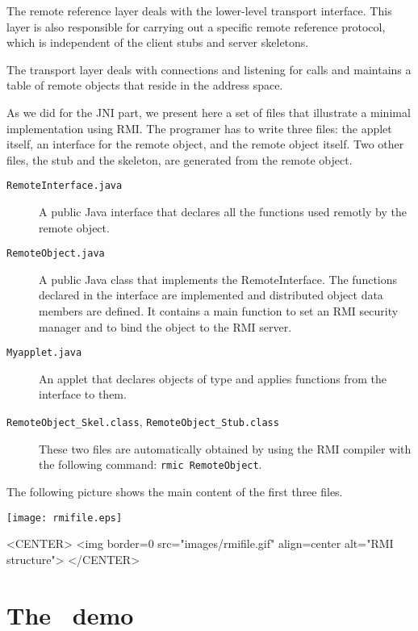 The remote reference layer deals with the lower-level transport
interface. This layer is also responsible for carrying out a specific
remote reference protocol, which is independent of the client stubs and
server skeletons. 

The transport layer deals with connections and listening for calls and
maintains a table of remote objects that reside in the address space. 

As we did for the JNI part, we present here a set of files that illustrate
a minimal implementation using RMI. The programer has to write
three files: the applet itself, an interface for the remote object,
and the remote object itself. Two other files, the stub and the skeleton,
are generated from the remote object.

\begin{description}
\item[{\tt RemoteInterface.java}] A public Java interface that 
     declares all the functions used remotly by the remote object.
\item[{\tt RemoteObject.java}] A public Java class that 
     implements the RemoteInterface. The functions declared in the interface 
     are implemented and distributed object data members are defined. It 
     contains a main function to set an RMI security manager and to bind 
     the object to the RMI server.
\item[{\tt Myapplet.java}] An applet that declares objects of type 
      and applies functions from the interface to them.
\item[{\tt RemoteObject\_Skel.class}, {\tt RemoteObject\_Stub.class}] 
     These two files are automatically obtained by using the RMI compiler
     with the following command: {\tt rmic RemoteObject}.
\end{description}

The following picture shows the main content of the first three
files.

\begin{ccTexOnly}
\begin{center}
\texttt{[image: rmifile.eps]}
\end{center}
\end{ccTexOnly}
\begin{ccHtmlOnly}
<CENTER>
<img border=0 src="images/rmifile.gif" align=center alt="RMI structure"> 
</CENTER>
\end{ccHtmlOnly}

\section{The \cgal\ demo}
\label{sec:cgal_demo}

